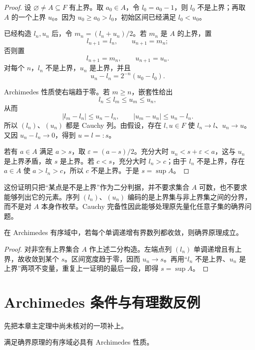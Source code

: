 \begin{proof}
设 \(\varnothing\ne A\subseteq F\) 有上界。取 \(a_0\in A\)，令 \(l_0=a_0-1\)，则 \(l_0\) 不是上界；再取 \(A\) 的一个上界 \(u_0\)。因为 \(u_0\ge a_0>l_0\)，初始区间已经满足 \(l_0<u_0\)。

已经构造 \(l_n,u_n\) 后，令 \(m_n=(l_n+u_n)/2\)。若 \(m_n\) 是 \(A\) 的上界，置
\[
 l_{n+1}=l_n,\qquad u_{n+1}=m_n;
\]
否则置
\[
 l_{n+1}=m_n,\qquad u_{n+1}=u_n.
\]
对每个 \(n\)，\(l_n\) 不是上界，\(u_n\) 是上界，并且
\[
 u_n-l_n=2^{-n}(u_0-l_0).
\]

Archimedes 性质使右端趋于零。若 \(m\ge n\)，嵌套性给出
\[
 l_n\le l_m\le u_m\le u_n,
\]
从而
\[
 |l_m-l_n|\le u_n-l_n,
 \qquad
 |u_m-u_n|\le u_n-l_n.
\]
所以 \((l_n)\)、\((u_n)\) 都是 Cauchy 列。由假设，存在 \(l,u\in F\) 使 \(l_n\to l\)、\(u_n\to u\)。又因 \(u_n-l_n\to0\)，得到 \(u=l=:s\)。

若有 \(a\in A\) 满足 \(a>s\)，取 \(\varepsilon=(a-s)/2\)。充分大时 \(u_n<s+\varepsilon<a\)，这与 \(u_n\) 是上界矛盾，故 \(s\) 是上界。若 \(c<s\)，充分大时 \(l_n>c\)；由于 \(l_n\) 不是上界，存在 \(a\in A\) 使 \(a>l_n>c\)，所以 \(c\) 不是上界。于是 \(s=\sup A\)。
\end{proof}

这份证明只把“某点是不是上界”作为二分判据，并不要求集合 \(A\) 可数，也不要求能够列出它的元素。序列 \((l_n)\)、\((u_n)\) 编码的是上界集与非上界集之间的分界，而不是对 \(A\) 本身作枚举。Cauchy 完备性因此能够处理原先量化任意子集的确界问题。

\begin{proposition}
在 Archimedes 有序域中，若每个单调递增有界数列都收敛，则确界原理成立。
\end{proposition}

\begin{proof}
对非空有上界集合 \(A\) 作上述二分构造。左端点列 \((l_n)\) 单调递增且有上界，故收敛到某个 \(s\)。区间宽度趋于零，因而 \(u_n\to s\)。再用“\(l_n\) 不是上界、\(u_n\) 是上界”两项不变量，重复上一证明的最后一段，即得 \(s=\sup A\)。
\end{proof}

\section{Archimedes 条件与有理数反例}

先把本章主定理中尚未核对的一项补上。

\begin{proposition}
满足确界原理的有序域必具有 Archimedes 性质。
\end{proposition}

